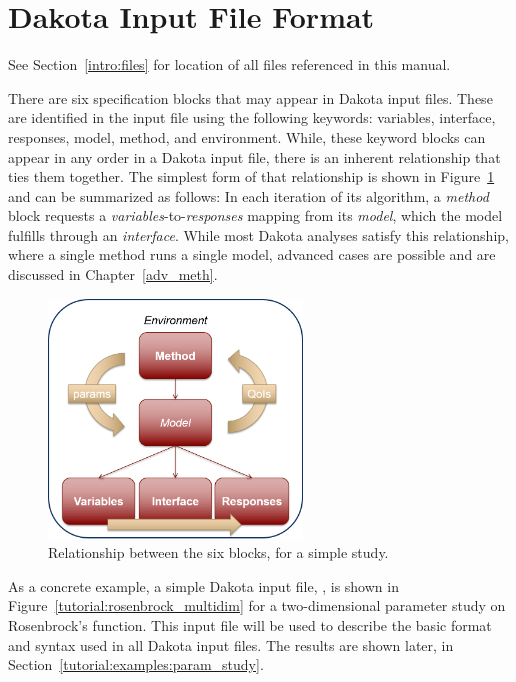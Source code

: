 \section{Dakota Input File Format}\label{tutorial:dakota}

See Section~\ref{intro:files} for location of all files referenced in this
manual.

There are six specification blocks that may appear in Dakota input
files. These are identified in the input file using the following
keywords: variables, interface, responses, model, method, and
environment. While, these keyword blocks can appear in any order in a
Dakota input file, there is an inherent relationship that ties them
together. The simplest form of that relationship is shown in
Figure~\ref{tutorial:inputfile_block_layout} and can be summarized as
follows: In each iteration of its algorithm, a \emph{method} block
requests a \emph{variables}-to-\emph{responses} mapping from its
\emph{model}, which the model fulfills through an \emph{interface}.
While most Dakota analyses satisfy this relationship, where a single
method runs a single model, advanced cases are possible and are
discussed in Chapter~\ref{adv_meth}.

\begin{figure}[ht!]
  \centering
  \includegraphics[height=2.5in]{images/InputBlocks}
  \caption{Relationship between the six blocks, for a simple study.}
  \label{tutorial:inputfile_block_layout}
\end{figure}

As a concrete example, a simple Dakota input file,
, is shown in
Figure~\ref{tutorial:rosenbrock_multidim} for a two-dimensional
parameter study on Rosenbrock's function.  This input file will be
used to describe the basic format and syntax used in all Dakota input
files.  The results are shown later, in
Section~\ref{tutorial:examples:param_study}.

